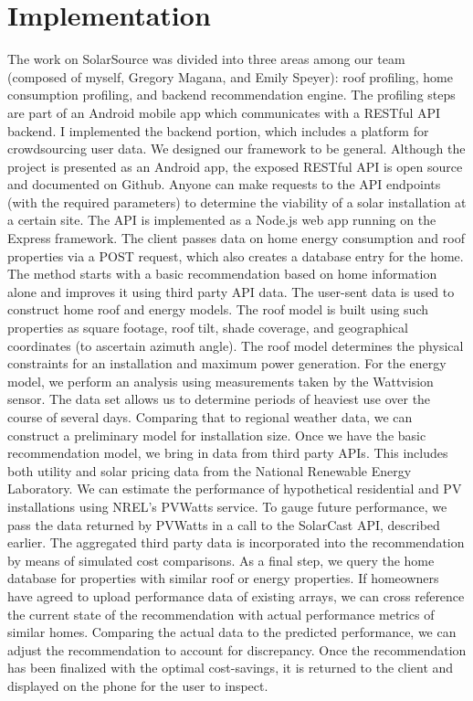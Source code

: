 \documentclass[pageno]{jpaper}
\begin{document}
\section{Implementation}
The work on SolarSource was divided into three areas among our team (composed of myself, Gregory Magana, and Emily Speyer): roof profiling, home consumption profiling, and backend recommendation engine. The profiling steps are part of an Android mobile app which communicates with a RESTful API backend. I implemented the backend portion, which includes a platform for crowdsourcing user data. \newline
\newline
We designed our framework to be general. Although the project is presented as an Android app, the exposed RESTful API is open source and documented on Github. Anyone can make requests to the API endpoints (with the required parameters) to determine the viability of a solar installation at a certain site. \newline
\newline
The API is implemented as a Node.js web app running on the Express framework. The client passes data on home energy consumption and roof properties via a POST request, which also creates a database entry for the home. The method starts with a basic recommendation based on home information alone and improves it using third party API data. The user-sent data is used to construct home roof and energy models. The roof model is built using such properties as square footage, roof tilt, shade coverage, and geographical coordinates (to ascertain azimuth angle). The roof model determines the physical constraints for an installation and maximum power generation. For the energy model, we perform an analysis using measurements taken by the Wattvision sensor. The data set allows us to determine periods of heaviest use over the course of several days. Comparing that to regional weather data, we can construct a preliminary model for installation size. \newline
\newline
Once we have the basic recommendation model, we bring in data from third party APIs. This includes both utility and solar pricing data from the National Renewable Energy Laboratory. We can estimate the performance of hypothetical residential and PV installations using NREL's PVWatts service. To gauge future performance, we pass the data returned by PVWatts in a call to the SolarCast API, described earlier. The aggregated third party data is incorporated into the recommendation by means of simulated cost comparisons. \newline
\newline
As a final step, we query the home database for properties with similar roof or energy properties. If homeowners have agreed to upload performance data of existing arrays, we can cross reference the current state of the recommendation with actual performance metrics of similar homes. Comparing the actual data to the predicted performance, we can adjust the recommendation to account for discrepancy. Once the recommendation has been finalized with the optimal cost-savings, it is returned to the client and displayed on the phone for the user to inspect.
\end{document}
